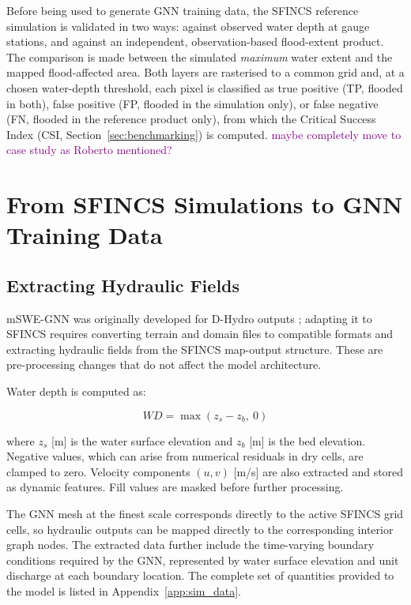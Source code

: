 \documentclass[12pt,a4paper]{report}
\begin{document}
Before being used to generate GNN training data, the SFINCS reference simulation is
validated in two ways: against observed water depth at gauge stations, and against an
independent, observation-based flood-extent product. The
comparison is made between the simulated \emph{maximum} water extent and the mapped
flood-affected area. Both layers are rasterised to a common grid and, at a chosen
water-depth threshold, each pixel is classified as true positive (TP, flooded in both),
false positive (FP, flooded in the simulation only), or false negative (FN, flooded in
the reference product only), from which the Critical Success Index (CSI,
Section~\ref{sec:benchmarking}) is computed.
\textcolor{purple}{maybe completely move to case study as Roberto mentioned?}
 
\section{From SFINCS Simulations to GNN Training Data}
\label{sec:dataset_generation}
 
\subsection{Extracting Hydraulic Fields}
\label{subsec:sfincs_to_graph}
 
mSWE-GNN was originally developed for D-Hydro
outputs \citep{bentivoglio2025mswegnn}; adapting it to SFINCS requires converting terrain
and domain files to compatible formats and extracting hydraulic fields from the SFINCS
map-output structure. These are pre-processing changes that do not affect the model
architecture.
 
Water depth is computed as:
 
\begin{equation}
    WD = \max(z_s - z_b,\ 0)
    \label{eq:waterdepth}
\end{equation}
 
where $z_s$ [m] is the water surface elevation and $z_b$ [m] is the bed elevation.
Negative values, which can arise from numerical residuals in dry cells, are clamped to
zero. Velocity components $(u, v)$ [m/s] are also extracted and stored as dynamic
features. Fill values are masked before further processing.
 
The GNN mesh at the finest scale corresponds directly to the active SFINCS grid cells, so hydraulic outputs can be mapped directly to the corresponding interior graph nodes. The extracted data further include the time-varying boundary conditions required by the GNN, represented by water surface elevation and unit discharge at each boundary location. The complete set of quantities provided to the model is listed in Appendix~\ref{app:sim_data}.
 
\end{document}
